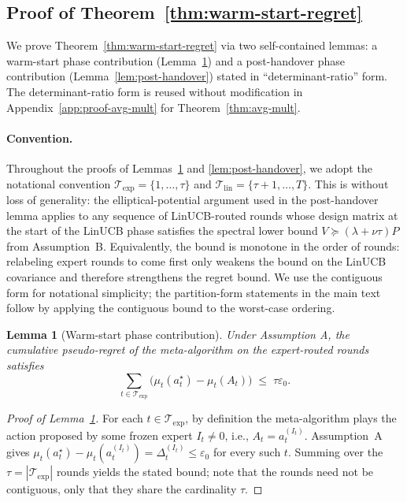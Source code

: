 \documentclass{article}
\newtheorem{lemma}{Lemma}
\theoremstyle{definition}
\theoremstyle{remark}
\theoremstyle{remark}
\begin{document}
\subsection{Proof of Theorem~\ref{thm:warm-start-regret}}
\label{app:proof-warm-start}

We prove Theorem~\ref{thm:warm-start-regret} via two self-contained
lemmas: a warm-start phase contribution
(Lemma~\ref{lem:warm-start-phase}) and a post-handover phase
contribution (Lemma~\ref{lem:post-handover}) stated in
``determinant-ratio'' form. The determinant-ratio form is reused
without modification in Appendix~\ref{app:proof-avg-mult} for
Theorem~\ref{thm:avg-mult}.

\paragraph{Convention.} Throughout the proofs of
Lemmas~\ref{lem:warm-start-phase} and \ref{lem:post-handover}, we adopt
the notational convention
$\mathcal T_{\mathrm{exp}}=\{1,\dots,\tau\}$ and
$\mathcal T_{\mathrm{lin}}=\{\tau+1,\dots,T\}$. This is without loss
of generality: the elliptical-potential argument used in the
post-handover lemma applies to any sequence of LinUCB-routed rounds
whose design matrix at the start of the LinUCB phase satisfies the
spectral lower bound $V\succeq(\lambda+\nu\tau)P$ from Assumption~B.
Equivalently, the bound is monotone in the order of rounds: relabeling
expert rounds to come first only weakens the bound on the LinUCB
covariance and therefore strengthens the regret bound. We use the
contiguous form for notational simplicity; the partition-form
statements in the main text follow by applying the contiguous bound to
the worst-case ordering.

\begin{lemma}[Warm-start phase contribution]
\label{lem:warm-start-phase}
Under Assumption A, the cumulative pseudo-regret of the meta-algorithm
on the expert-routed rounds satisfies
\[
\sum_{t \in \mathcal T_{\mathrm{exp}}}\bigl(\mu_t(a_t^\star)-\mu_t(A_t)\bigr)
\;\le\;
\tau\varepsilon_0.
\]
\end{lemma}

\begin{proof}[Proof of Lemma~\ref{lem:warm-start-phase}]
For each $t\in\mathcal T_{\mathrm{exp}}$, by definition the
meta-algorithm plays the action proposed by some frozen expert $I_t \ne 0$,
i.e., $A_t = a_t^{(I_t)}$. Assumption~A gives
$\mu_t(a_t^\star)-\mu_t(a_t^{(I_t)})=\Delta_t^{(I_t)}\le\varepsilon_0$
for every such $t$. Summing over the $\tau = |\mathcal T_{\mathrm{exp}}|$
rounds yields the stated bound; note that the rounds need not be
contiguous, only that they share the cardinality $\tau$.
\end{proof}
\end{document}
